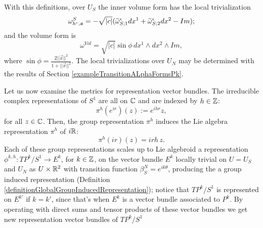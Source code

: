 With this definitions, over $U_S$ the inner volume form has the local trivialization
\begin{equation}
    \omega^S_{h^c, \alg a} = -\sqrt{|c|} (\tilde \omega^\epsilon_{S; 1}dx^1 + \tilde \omega^\epsilon_{S; 2}dx^2 - Im);
\end{equation}
and the volume form is
\begin{equation}
    \omega^{Vol} = \sqrt{|c|} \sin \phi \, dx^1 \wedge dx^2 \wedge Im,
\end{equation}
where $\sin \phi = \frac{2 ||\vec x||^2}{1 + ||\vec x||^2}$.
The local trivializations over $U_N$ may be determined with the results of Section \ref{exampleTransitionALphaFormsPk}.

Let us now examine the metrics for representation vector bundles. The irreducible complex representations of $S^1$ are all on $\mathbb{C}$ and are indexed by $h \in \mathbb{Z}$:
\begin{equation*}
    \pi^h(e^{ir})(z) := e^{ihr}z,
\end{equation*}
for all $z \in \mathbb{C}$. Then, the group representation $\pi^h$ induces the Lie algebra representation $\pi^h$ of $i\mathbb{R}$:
\begin{equation}\label{equationRepresentationS1Ch}
    \pi^h(ir)(z) = irh\,z.
\end{equation}
Each of these group representations scales up to Lie algebroid a representation $\phi^{k, h}: TP^k/S^1 \to E^k$, for $k \in \mathbb{Z}$, on the vector bundle $E^k$ locally trivial on $U = U_S$ and $U_N$ as $U\times \mathbb{R}^2$ with transition function $\beta^N_S = e^{ik\theta}$, producing the a group induced representation (Definition \ref{definitionGlobalGroupInducedRepresentation}); notice that $TP^k/S^1$ is represented on $E^{k'}$ if $k = k'$, since that's when $E^k$ is a vector bundle associated to $P^k$. By operating with direct sums and tensor products of these vector bundles we get new representation vector bundles of $TP^k/S^1$

